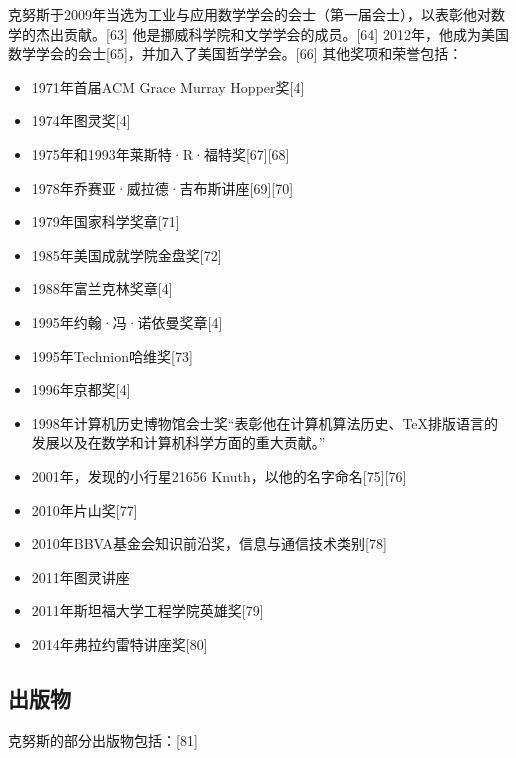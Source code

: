 克努斯于2009年当选为工业与应用数学学会的会士（第一届会士），以表彰他对数学的杰出贡献。[63] 他是挪威科学院和文学学会的成员。[64] 2012年，他成为美国数学学会的会士[65]，并加入了美国哲学学会。[66] 其他奖项和荣誉包括：
\begin{itemize}
\item 1971年首届ACM Grace Murray Hopper奖[4]  
\item 1974年图灵奖[4]  
\item 1975年和1993年莱斯特·R·福特奖[67][68]  
\item 1978年乔赛亚·威拉德·吉布斯讲座[69][70]  
\item 1979年国家科学奖章[71]  
\item 1985年美国成就学院金盘奖[72]  
\item 1988年富兰克林奖章[4]  
\item 1995年约翰·冯·诺依曼奖章[4]  
\item 1995年Technion哈维奖[73]  
\item 1996年京都奖[4]  
\item 1998年计算机历史博物馆会士奖“表彰他在计算机算法历史、TeX排版语言的发展以及在数学和计算机科学方面的重大贡献。”  
\item 2001年，发现的小行星21656 Knuth，以他的名字命名[75][76]  
\item 2010年片山奖[77]  
\item 2010年BBVA基金会知识前沿奖，信息与通信技术类别[78]  
\item 2011年图灵讲座  
\item 2011年斯坦福大学工程学院英雄奖[79]  
\item 2014年弗拉约雷特讲座奖[80]
\end{itemize}
\subsection{出版物} 
克努斯的部分出版物包括：[81]

